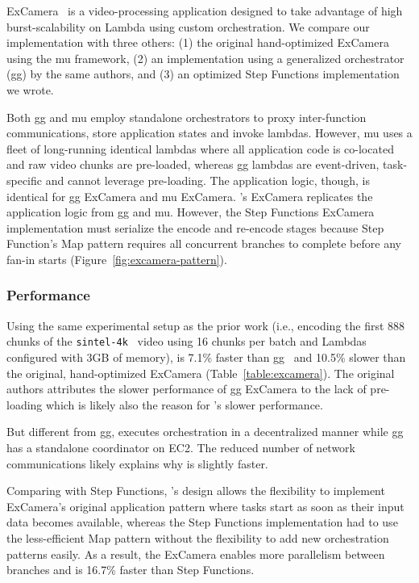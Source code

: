 ExCamera~\mbox{\cite{excamera}} is a video-processing application designed to
take advantage of high burst-scalability on Lambda using custom orchestration.
We compare our \name{} implementation with three others: (1) the original
hand-optimized ExCamera using the mu framework, (2) an implementation using a
generalized orchestrator (gg) by the same authors, and (3) an optimized Step
Functions implementation we wrote.

Both gg and mu employ standalone orchestrators to proxy inter-function
communications, store application states and invoke lambdas. However, mu uses
a fleet of long-running identical lambdas where all application code is
co-located and raw video chunks are pre-loaded, whereas gg lambdas are
event-driven, task-specific and cannot leverage pre-loading. The application
logic, though, is identical for gg ExCamera and mu ExCamera. \name{}'s
ExCamera replicates the application logic from gg and mu. However, the Step
Functions ExCamera implementation must serialize the encode and re-encode
stages because Step Function's Map pattern requires all concurrent branches to
complete before any fan-in starts (Figure~\ref {fig:excamera-pattern}).

\subsubsection{Performance}

Using the same experimental setup as the prior work (i.e., encoding the first
888 chunks of the \texttt{sintel-4k}~\mbox{\cite{sintel}} video using 16
chunks per batch and Lambdas configured with 3GB of memory), \name{} is 7.1\%
faster than gg~\mbox{\cite{gg-atc}} and 10.5\% slower than the original,
hand-optimized ExCamera (Table~\ref{table:excamera}). The original authors
attributes the slower performance of gg ExCamera to the lack of pre-loading
which is likely also the reason for \name{}'s slower performance.

But different from gg, \name{} executes orchestration in a decentralized
manner while gg has a standalone coordinator on EC2. The reduced number of
network communications likely explains why \name{} is slightly faster.

Comparing with Step Functions, \name{}'s design allows the flexibility to
implement ExCamera's original application pattern where tasks start as soon as
their input data becomes available, whereas the Step Functions implementation
had to use the less-efficient Map pattern without the flexibility to add new
orchestration patterns easily. As a result, the \name{} ExCamera enables more
parallelism between branches and is 16.7\% faster than Step Functions.

